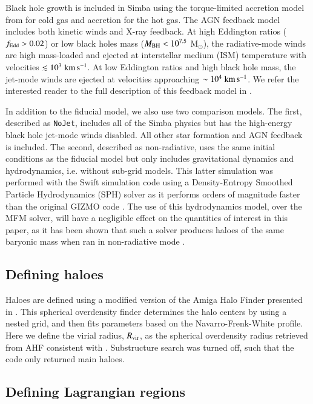 \documentclass[fleqn,usenatbib]{mnras}
\newcommand{\kms}{\;{\rm km}\,{\rm s}^{-1}}
\newcommand{\simba}{{\sc Simba}}
\newcommand{\nojet}{{\tt NoJet}}
\begin{document}
Black hole growth is included in \simba{} using the torque-limited accretion
model from \citet{AnglesAlcazar2017b} for cold gas and \citet{Bondi1952}
accretion for the hot gas. The AGN feedback model includes both kinetic winds
and X-ray feedback. At high Eddington ratios ($f_{\rm Edd} > 0.02$) or low
black holes mass ($M_{\rm BH} < 10^{7.5}$ M$_\odot$), the radiative-mode
winds are high mass-loaded and ejected at interstellar medium (ISM)
temperature with velocities $\lesssim 10^3 \kms{}$. At low Eddington ratios
and high black hole mass, the jet-mode winds are ejected at velocities
approaching $\sim 10^4\kms{}$. We refer the interested reader to the full
description of this feedback model in \citet{Dave2019}.

In addition to the fiducial model, we also use two comparison models. The
first, described as \nojet{}, includes all of the \simba{} physics but has
the high-energy black hole jet-mode winds disabled. All other star formation
and AGN feedback is included. The second, described as non-radiative, uses
the same initial conditions as the fiducial model but only includes
gravitational dynamics and hydrodynamics, i.e. without sub-grid models. This
latter simulation was performed with the {\sc Swift} simulation code
\citep{Schaller2016} using a Density-Entropy Smoothed Particle Hydrodynamics
(SPH) solver as it performs orders of magnitude faster than the original
GIZMO code \citep{Borrow2018}. The use of this hydrodynamics model, over the
MFM solver, will have a negligible effect on the quantities of interest in
this paper, as it has been shown that such a solver produces haloes of the
same baryonic mass when ran in non-radiative mode \citep[see
e.g.][]{Sembolini2016}.

\subsection{Defining haloes}

Haloes are defined using a modified version of the Amiga Halo Finder
\citep[AHF, ][]{Gill2004, Knollmann2009} presented in \citet{Muratov2015}.
This spherical overdensity finder determines the halo centers by using a
nested grid, and then fits parameters based on the Navarro-Frenk-White
\citep[NFW, ][]{Navarro1995} profile. Here we define the virial radius,
$R_{\rm vir}$, as the spherical overdensity radius retrieved from AHF consistent
with \citet{Bryan1998}. Substructure search was turned off, such that the
code only returned main haloes.

\subsection{Defining Lagrangian regions}
\end{document}
